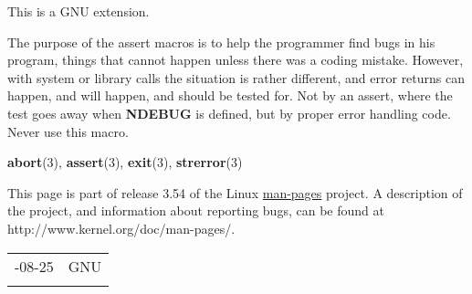 \documentclass[]{article}
\let\realtextbf=\textbf
\renewcommand{\textbf}[1]{\textcolor{boldcolor}{\realtextbf{#1}}}
\renewcommand{\emph}[1]{\underline{#1}}
\begin{document}

This is a GNU extension.


The purpose of the assert macros is to help the programmer find bugs in
his program, things that cannot happen unless there was a coding
mistake. However, with system or library calls the situation is rather
different, and error returns can happen, and will happen, and should be
tested for. Not by an assert, where the test goes away when
\textbf{NDEBUG} is defined, but by proper error handling code. Never use
this macro.


\textbf{abort}(3), \textbf{assert}(3), \textbf{exit}(3),
\textbf{strerror}(3)


This page is part of release 3.54 of the Linux \emph{man-pages} project.
A description of the project, and information about reporting bugs, can
be found at http://www.kernel.org/doc/man-pages/.

\begin{longtable}[c]{@{}ll@{}}
\toprule\addlinespace
2002-08-25 & GNU
\\\addlinespace
\bottomrule
\end{longtable}
\end{document}
